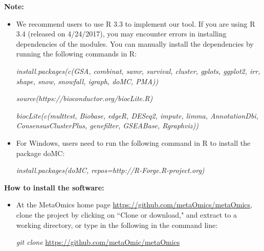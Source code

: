 \noindent\textbf{Note:}

\begin{itemize}
\item We recommend users to use R 3.3 to implement our tool. If you are using R 3.4 (released on 4/24/2017), you may encounter errors in installing dependencies of the modules. You can manually install the dependencies by running the following commands in R:

\textit{install.packages(c(\textquotesingle GSA\textquotesingle, \textquotesingle combinat\textquotesingle, \textquotesingle   samr\textquotesingle   , \textquotesingle   survival\textquotesingle   , \textquotesingle   cluster\textquotesingle   , \textquotesingle   gplots\textquotesingle   , 
  \textquotesingle   ggplot2\textquotesingle   , \textquotesingle   irr\textquotesingle   , \textquotesingle   shape\textquotesingle   , \textquotesingle   snow\textquotesingle   , \textquotesingle   snowfall\textquotesingle   , \textquotesingle   igraph\textquotesingle   , \textquotesingle   doMC\textquotesingle   , \textquotesingle   PMA\textquotesingle   ))
  }

\textit{source(\textquotesingle   https://bioconductor.org/biocLite.R\textquotesingle   )  }

\textit{biocLite(c(\textquotesingle   multtest\textquotesingle   , \textquotesingle   Biobase\textquotesingle   , \textquotesingle   edgeR\textquotesingle   , \textquotesingle   DESeq2\textquotesingle   , \textquotesingle   impute\textquotesingle   , 
  \textquotesingle   limma\textquotesingle   , \textquotesingle   AnnotationDbi\textquotesingle   , \textquotesingle   ConsensusClusterPlus\textquotesingle   , \textquotesingle   genefilter\textquotesingle   , \textquotesingle   GSEABase\textquotesingle   , \textquotesingle   Rgraphviz\textquotesingle   ))
  }

\item For Windows, users need to run the following command in R to install the package \textquotesingle doMC\textquotesingle:

\textit{install.packages(\textquotesingle doMC\textquotesingle, repos=\textquotesingle http://R-Forge.R-project.org\textquotesingle)}

\end{itemize}

 

\noindent\textbf{How to install the software:}
\begin{itemize}
\item At the MetaOmics home page \url{https://github.com/metaOmics/metaOmics}, clone the project by
clicking on ``Clone or download," and extract to a working directory, 
or type in the following in the command line:

\textit{git clone} \url{https://github.com/metaOmic/metaOmics}
\end{itemize}


